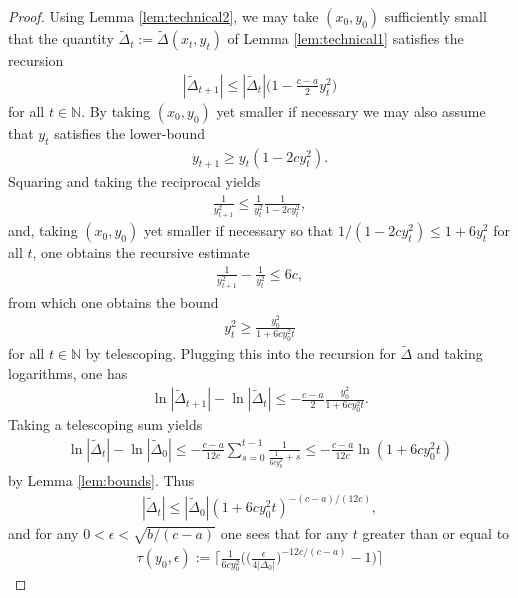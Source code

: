 \documentclass{article}
\newcommand{\NB}{\mathbb{N}}
\theoremstyle{plain}
\theoremstyle{definition}
\theoremstyle{remark}
\begin{document}
\begin{proof}
    Using Lemma \ref{lem:technical2}, we may take $(x_0,y_0)$ sufficiently small that the quantity $\widetilde{\Delta}_t:=\widetilde{\Delta}(x_t,y_t)$ of Lemma \ref{lem:technical1} satisfies the recursion
    \begin{align}
        |\widetilde{\Delta}_{t+1}|\leq |\widetilde{\Delta}_t|\bigg(1-\frac{c-a}{2}y_t^2\bigg)
    \end{align}
    for all $t\in\NB$. By taking $(x_0,y_0)$ yet smaller if necessary we may also assume that $y_t$ satisfies the lower-bound
    \begin{align}
        y_{t+1}\geq y_t(1-2cy_t^2).
    \end{align}
    Squaring and taking the reciprocal yields
    \begin{align}
        \frac{1}{y_{t+1}^2}\leq \frac{1}{y_t^2}\frac{1}{1-2cy_t^2},
    \end{align}
    and, taking $(x_0,y_0)$ yet smaller if necessary so that $1/(1-2cy_t^2)\leq 1+6y_t^2$ for all $t$, one obtains the recursive estimate
    \begin{align}
        \frac{1}{y_{t+1}^2}-\frac{1}{y_t^2}\leq 6c,
    \end{align}
    from which one obtains the bound
    \begin{align}
        y_t^2\geq \frac{y_0^2}{1+6cy_0^2t}\label{eq:ybound}
    \end{align}
    for all $t\in\NB$ by telescoping. Plugging this into the recursion for $\widetilde{\Delta}$ and taking logarithms, one has
    \begin{align}
        \ln|\widetilde{\Delta}_{t+1}|-\ln|\widetilde{\Delta}_t|\leq -\frac{c-a}{2}\frac{y_0^2}{1+6cy_0^2t}.
    \end{align}
    Taking a telescoping sum yields
    \begin{align}
        \ln|\widetilde{\Delta}_t|-\ln|\widetilde{\Delta}_0|\leq -\frac{c-a}{12c}\sum_{s=0}^{t-1}\frac{1}{\frac{1}{6cy_0^2}+s}\leq -\frac{c-a}{12c}\ln(1+6cy_0^2t)
    \end{align}
    by Lemma \ref{lem:bounds}. Thus
    \begin{align}
        |\widetilde{\Delta}_t|\leq |\widetilde{\Delta}_0|(1+6cy_0^2t)^{-(c-a)/(12c)},
    \end{align}
    and for any $0<\epsilon<\sqrt{b/(c-a)}$ one sees that for any $t$ greater than or equal to
    \begin{align}
        \tau(y_0,\epsilon):=\bigg\lceil\frac{1}{6cy_0^2}\bigg(\bigg(\frac{\epsilon}{4|\Delta_0|}\bigg)^{-12c/(c-a)}-1\bigg)\bigg\rceil

\end{align}
\end{proof}
\end{document}
